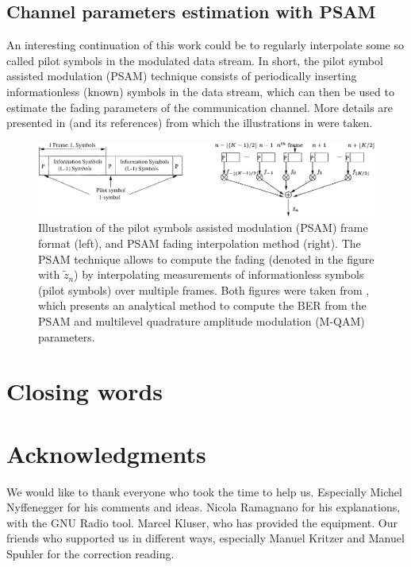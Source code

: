 \subsection{Channel parameters estimation with PSAM} \label{sec:psam}

An interesting continuation of this work could be to regularly interpolate some so called pilot symbols in the modulated data stream. In short, the pilot symbol assisted modulation (PSAM) technique consists of periodically inserting informationless (known) symbols in the data stream, which can then be used to estimate the fading parameters of the communication channel. More details are presented in \cite{Xiaoyi1999} (and its references) from which the illustrations in  were taken.

\begin{figure}
	\centering
	\includegraphics[width = \linewidth]{figures/xiaoyi-psam-figures}
	\caption{
		Illustration of the pilot symbols assisted modulation (PSAM) frame format (left), and PSAM fading interpolation method (right). The PSAM technique allows to compute the fading (denoted in the figure with \(\tilde{z}_n\)) by interpolating measurements of informationless symbols (pilot symbols) over multiple frames. Both figures were taken from \cite{Xiaoyi1999}, which presents an analytical method to compute the BER from the PSAM and multilevel quadrature amplitude modulation (M-QAM) parameters.
		\label{fig:psam}
	}
\end{figure}

\section{Closing words}


\section{Acknowledgments}


We would like to thank everyone who took the time to help us. Especially Michel Nyffenegger for his comments and ideas. Nicola Ramagnano for his explanations, with the GNU Radio tool. Marcel Kluser, who has provided the equipment. Our friends who supported us in different ways, especially Manuel Kritzer and Manuel Spuhler for the correction reading.




